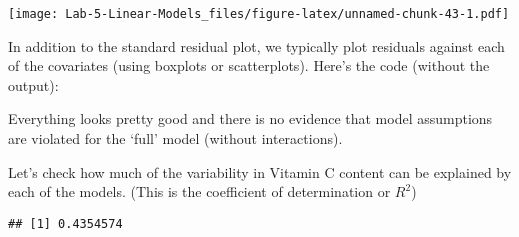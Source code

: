 \documentclass[
]{article}
\newenvironment{Shaded}{\begin{snugshade}}{\end{snugshade}}
\newcommand{\AttributeTok}[1]{\textcolor[rgb]{0.77,0.63,0.00}{#1}}
\newcommand{\CommentTok}[1]{\textcolor[rgb]{0.56,0.35,0.01}{\textit{#1}}}
\newcommand{\DecValTok}[1]{\textcolor[rgb]{0.00,0.00,0.81}{#1}}
\newcommand{\FunctionTok}[1]{\textcolor[rgb]{0.00,0.00,0.00}{#1}}
\newcommand{\NormalTok}[1]{#1}
\newcommand{\SpecialCharTok}[1]{\textcolor[rgb]{0.00,0.00,0.00}{#1}}
\begin{document}
\texttt{[image: Lab-5-Linear-Models\_files/figure-latex/unnamed-chunk-43-1.pdf]}

In addition to the standard residual plot, we typically plot residuals
against each of the covariates (using boxplots or scatterplots). Here's
the code (without the output):

\begin{Shaded}
\end{Shaded}

Everything looks pretty good and there is no evidence that model
assumptions are violated for the `full' model (without interactions).

Let's check how much of the variability in Vitamin C content can be
explained by each of the models. (This is the coefficient of
determination or \(R^{2}\))

\begin{Shaded}
\end{Shaded}

\begin{verbatim}
## [1] 0.4354574
\end{verbatim}

\begin{Shaded}
\end{Shaded}
\end{document}
